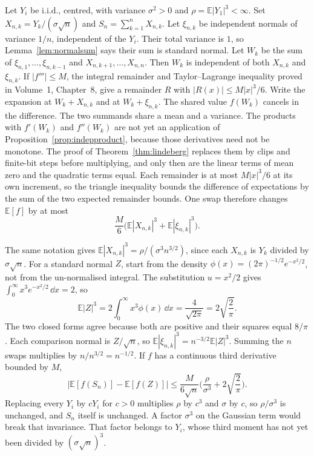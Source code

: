 \begin{examplex}
Let $Y_i$ be i.i.d., centred, with variance $\sigma^2>0$ and $\rho=\mathbb E|Y_1|^3<\infty$. Set $X_{n,k}=Y_k/(\sigma\sqrt n)$ and $S_n=\sum_{k=1}^n X_{n,k}$. Let $\xi_{n,k}$ be independent normals of variance $1/n$, independent of the $Y_i$. Their total variance is $1$, so Lemma~\ref{lem:normalsum} says their sum is standard normal. Let $W_k$ be the sum of $\xi_{n,1},\ldots,\xi_{n,k-1}$ and $X_{n,k+1},\ldots,X_{n,n}$. Then $W_k$ is independent of both $X_{n,k}$ and $\xi_{n,k}$. If $|f'''|\le M$, the integral remainder and Taylor--Lagrange inequality proved in Volume~1, Chapter~8, give a remainder $R$ with $|R(x)|\le M|x|^3/6$. Write the expansion at $W_k+X_{n,k}$ and at $W_k+\xi_{n,k}$. The shared value $f(W_k)$ cancels in the difference. The two summands share a mean and a variance. The products with $f'(W_k)$ and $f''(W_k)$ are not yet an application of Proposition~\ref{prop:indepproduct}, because those derivatives need not be monotone. The proof of Theorem~\ref{thm:lindeberg} replaces them by clips and finite-bit steps before multiplying, and only then are the linear terms of mean zero and the quadratic terms equal. Each remainder is at most $M|x|^3/6$ at its own increment, so the triangle inequality bounds the difference of expectations by the sum of the two expected remainder bounds. One swap therefore changes $\mathbb E[f]$ by at most
\[
 \frac M6\bigl(\mathbb E|X_{n,k}|^3+\mathbb E|\xi_{n,k}|^3\bigr).
\]
\end{examplex}

\begin{examplex}
The same notation gives $\mathbb E|X_{n,k}|^3=\rho/(\sigma^3 n^{3/2})$, since each $X_{n,k}$ is $Y_k$ divided by $\sigma\sqrt n$. For a standard normal $Z$, start from the density $\phi(x)=(2\pi)^{-1/2}e^{-x^2/2}$, not from the un-normalised integral. The substitution $u=x^2/2$ gives $\int_0^\infty x^3 e^{-x^2/2}\,\dd x=2$, so
\[
 \mathbb E|Z|^3=2\int_0^\infty x^3\phi(x)\,\dd x=\frac{4}{\sqrt{2\pi}}=2\sqrt{\frac{2}{\pi}}.
\]
The two closed forms agree because both are positive and their squares equal $8/\pi$. Each comparison normal is $Z/\sqrt n$, so $\mathbb E|\xi_{n,k}|^3=n^{-3/2}\mathbb E|Z|^3$. Summing the $n$ swaps multiplies by $n/n^{3/2}=n^{-1/2}$. If $f$ has a continuous third derivative bounded by $M$,
\[
 \bigl|\mathbb E[f(S_n)]-\mathbb E[f(Z)]\bigr|
 \le\frac{M}{6\sqrt n}\Biggl(\frac{\rho}{\sigma^3}+2\sqrt{\frac{2}{\pi}}\Biggr).
\]
Replacing every $Y_i$ by $cY_i$ for $c>0$ multiplies $\rho$ by $c^3$ and $\sigma$ by $c$, so $\rho/\sigma^3$ is unchanged, and $S_n$ itself is unchanged. A factor $\sigma^3$ on the Gaussian term would break that invariance. That factor belongs to $Y_i$, whose third moment has not yet been divided by $(\sigma\sqrt n)^3$.
\end{examplex}

